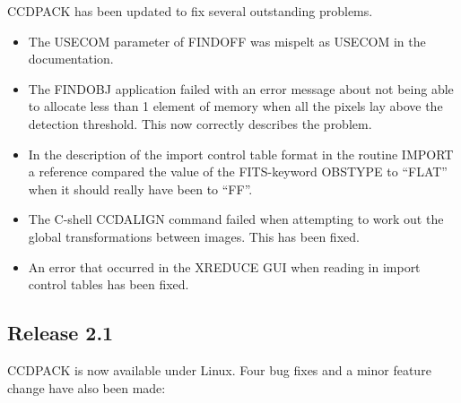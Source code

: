 \documentclass[twoside,11pt]{article}
\newcommand{\htmlref}[2]{#1}
\renewcommand{\_}{\texttt{\symbol{95}}}
\newcommand{\xroutine}[1]{\htmlref{{\sc #1}}{#1}}
\begin{document}
CCDPACK has been updated to fix several outstanding problems.
\begin{itemize}

\item The USECOM parameter of \xroutine{FINDOFF} was mispelt as USECOM in the
documentation.

\item   The \xroutine{FINDOBJ} application failed with an error message about not
   being able to allocate less than 1 element of memory when all
   the pixels lay above the detection threshold. This now correctly
   describes the problem.

\item   In the description of the import control table format in the
   routine \xroutine{IMPORT} a reference compared the value of the FITS-keyword
   OBSTYPE to ``FLAT'' when it should really have been to ``FF''.

\item   The C-shell \xroutine{CCDALIGN} command failed when attempting to work out the
   global transformations between images. This has been fixed.

\item    An error that occurred in the \xroutine{XREDUCE} GUI when reading in import
   control tables has been fixed.
\end{itemize}

\subsection{Release 2.1}

 CCDPACK is now available under Linux. Four bug fixes and a minor feature
 change have also been made:
\end{document}
